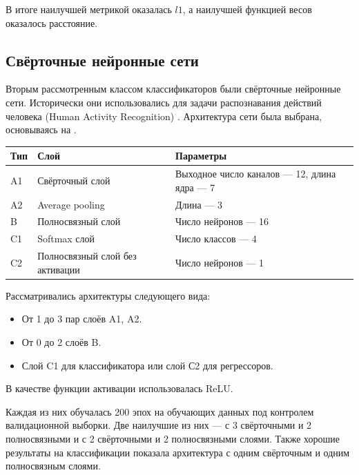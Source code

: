 \documentclass[12pt,twoside]{article}
\begin{document}
В итоге наилучшей метрикой оказалась $l1$, а наилучшей функцией весов оказалось расстояние.

\subsection{Свёрточные нейронные сети}

Вторым рассмотренным классом классификаторов были свёрточные нейронные сети. Исторически они использовались для задачи распознавания действий человека (Human Activity Recognition) \cite{7379395}. Архитектура сети была выбрана, основываясь на \cite{DBLP:journals/corr/abs-1809-04356} \cite{7870510}.

\begin{tabular}{l l l}
    Тип & Слой & Параметры \\
    \hline
    A1 & Свёрточный слой & Выходное число каналов --- 12, длина ядра --- 7 \\
    A2 & Average pooling & Длина --- 3\\
    B  & Полносвязный слой & Число нейронов --- 16\\
    C1 & Softmax слой & Число классов --- 4\\
    C2 & Полносвязный слой без активации & Число нейронов --- 1
\end{tabular}

Рассматривались архитектуры следующего вида:
\begin{itemize}
    \item От 1 до 3 пар слоёв A1, A2.
    \item От 0 до 2 слоёв B.
    \item Слой C1 для классификатора или слой С2 для регрессоров.
\end{itemize}
В качестве функции активации использовалась ReLU.

Каждая из них обучалась 200 эпох на обучающих данных под контролем валидационной выборки. Две наилучшие из них --- с 3 свёрточными и 2 полносвязными и с 2 свёрточными и 2 полносвязными слоями. Также хорошие результаты на классификации показала архитектура с одним свёрточным и одним полносвязным слоями.
\end{document}
